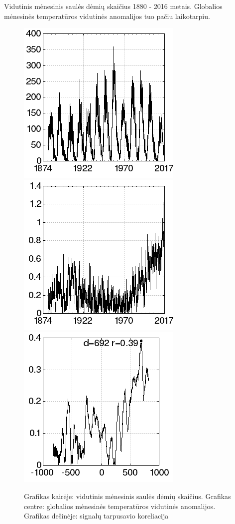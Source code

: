 Vidutinis mėnesinis saulės dėmių skaičius\cite{sunspots} 1880 - 2016 metais.
Globalios mėnesinės temperatūros vidutinės anomalijos\cite{temp} tuo pačiu laikotarpiu.

\begin{figure}
\includegraphics[scale=0.65]{../scripts/sunspots_temperature/sunspots.png}
\includegraphics[scale=0.65]{../scripts/sunspots_temperature/temp.png}
\includegraphics[scale=0.65]{../scripts/sunspots_temperature/result.png}
\caption{Grafikas kairėje: vidutinis mėnesinis saulės dėmių skaičius. Grafikas centre: globalios mėnesinės temperatūros vidutinės anomalijos. Grafikas dešinėje: signalų tarpusavio koreliacija}
\end{figure}

